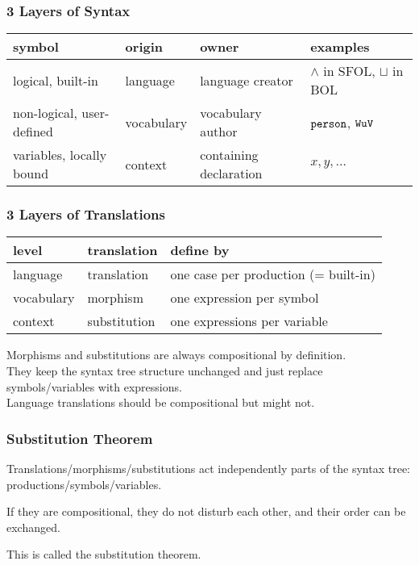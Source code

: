 \begin{frame}\frametitle{3 Layers of Syntax}
\begin{tabular}{p{2cm}|lp{2cm}l}
symbol                 & origin     & owner  & examples \\
\hline
logical, built-in      & language   & language creator  & $\wedge$ in SFOL, $\sqcup$ in BOL \\
non-logical, user-defined & vocabulary & vocabulary author & $\cn{person}$, $\cn{WuV}$\\
variables, locally bound  & context    & containing declaration & $x, y,\ldots$ \\
\end{tabular}

\end{frame}

\begin{frame}\frametitle{3 Layers of Translations}
\begin{tabular}{l|ll}
level & translation & define by\\
\hline
language & translation & one case per production (= built-in)\\
vocabulary & morphism & one expression per symbol\\
context & substitution & one expressions per variable \\
\end{tabular}
\bigskip

Morphisms and substitutions are always compositional by definition.\\
They keep the syntax tree structure unchanged and just replace symbols/variables with expressions.\\
Language translations should be compositional but might not.
\end{frame}

\begin{frame}\frametitle{Substitution Theorem}
Translations/morphisms/substitutions act independently parts of the syntax tree: productions/symbols/variables.\\
\bigskip

If they are compositional, they do not disturb each other, and their order can be exchanged.\\
\bigskip

This is called the substitution theorem.
\end{frame}


